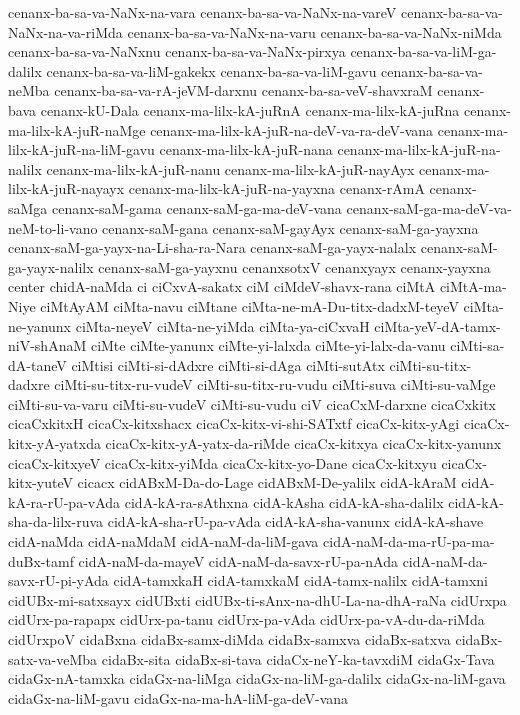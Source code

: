 {cenanx-ba-sa-va-NaNx-na-vara
cenanx-ba-sa-va-NaNx-na-vareV
cenanx-ba-sa-va-NaNx-na-va-riMda
cenanx-ba-sa-va-NaNx-na-varu
cenanx-ba-sa-va-NaNx-niMda
cenanx-ba-sa-va-NaNxnu
cenanx-ba-sa-va-NaNx-pirxya
cenanx-ba-sa-va-liM-ga-dalilx
cenanx-ba-sa-va-liM-gakekx
cenanx-ba-sa-va-liM-gavu
cenanx-ba-sa-va-neMba
cenanx-ba-sa-va-rA-jeVM-darxnu
cenanx-ba-sa-veV-shavxraM
cenanx-bava
cenanx-kU-Dala
cenanx-ma-lilx-kA-juRnA
cenanx-ma-lilx-kA-juRna
cenanx-ma-lilx-kA-juR-naMge
cenanx-ma-lilx-kA-juR-na-deV-va-ra-deV-vana
cenanx-ma-lilx-kA-juR-na-liM-gavu
cenanx-ma-lilx-kA-juR-nana
cenanx-ma-lilx-kA-juR-na-nalilx
cenanx-ma-lilx-kA-juR-nanu
cenanx-ma-lilx-kA-juR-nayAyx
cenanx-ma-lilx-kA-juR-nayayx
cenanx-ma-lilx-kA-juR-na-yayxna
cenanx-rAmA
cenanx-saMga
cenanx-saM-gama
cenanx-saM-ga-ma-deV-vana
cenanx-saM-ga-ma-deV-va-neM-to-li-vano
cenanx-saM-gana
cenanx-saM-gayAyx
cenanx-saM-ga-yayxna
cenanx-saM-ga-yayx-na-Li-sha-ra-Nara
cenanx-saM-ga-yayx-nalalx
cenanx-saM-ga-yayx-nalilx
cenanx-saM-ga-yayxnu
cenanxsotxV
cenanxyayx
cenanx-yayxna
center
chidA-naMda
ci
ciCxvA-sakatx
ciM
ciMdeV-shavx-rana
ciMtA
ciMtA-ma-Niye
ciMtAyAM
ciMta-navu
ciMtane
ciMta-ne-mA-Du-titx-dadxM-teyeV
ciMta-ne-yanunx
ciMta-neyeV
ciMta-ne-yiMda
ciMta-ya-ciCxvaH
ciMta-yeV-dA-tamx-niV-shAnaM
ciMte
ciMte-yanunx
ciMte-yi-lalxda
ciMte-yi-lalx-da-vanu
ciMti-sa-dA-taneV
ciMtisi
ciMti-si-dAdxre
ciMti-si-dAga
ciMti-sutAtx
ciMti-su-titx-dadxre
ciMti-su-titx-ru-vudeV
ciMti-su-titx-ru-vudu
ciMti-suva
ciMti-su-vaMge
ciMti-su-va-varu
ciMti-su-vudeV
ciMti-su-vudu
ciV
cicaCxM-darxne
cicaCxkitx
cicaCxkitxH
cicaCx-kitxshacx
cicaCx-kitx-vi-shi-SATxtf
cicaCx-kitx-yAgi
cicaCx-kitx-yA-yatxda
cicaCx-kitx-yA-yatx-da-riMde
cicaCx-kitxya
cicaCx-kitx-yanunx
cicaCx-kitxyeV
cicaCx-kitx-yiMda
cicaCx-kitx-yo-Dane
cicaCx-kitxyu
cicaCx-kitx-yuteV
cicacx
cidABxM-Da-do-Lage
cidABxM-De-yalilx
cidA-kAraM
cidA-kA-ra-rU-pa-vAda
cidA-kA-ra-sAthxna
cidA-kAsha
cidA-kA-sha-dalilx
cidA-kA-sha-da-lilx-ruva
cidA-kA-sha-rU-pa-vAda
cidA-kA-sha-vanunx
cidA-kA-shave
cidA-naMda
cidA-naMdaM
cidA-naM-da-liM-gava
cidA-naM-da-ma-rU-pa-ma-duBx-tamf
cidA-naM-da-mayeV
cidA-naM-da-savx-rU-pa-nAda
cidA-naM-da-savx-rU-pi-yAda
cidA-tamxkaH
cidA-tamxkaM
cidA-tamx-nalilx
cidA-tamxni
cidUBx-mi-satxsayx
cidUBxti
cidUBx-ti-sAnx-na-dhU-La-na-dhA-raNa
cidUrxpa
cidUrx-pa-rapapx
cidUrx-pa-tanu
cidUrx-pa-vAda
cidUrx-pa-vA-du-da-riMda
cidUrxpoV
cidaBxna
cidaBx-samx-diMda
cidaBx-samxva
cidaBx-satxva
cidaBx-satx-va-veMba
cidaBx-sita
cidaBx-si-tava
cidaCx-neY-ka-tavxdiM
cidaGx-Tava
cidaGx-nA-tamxka
cidaGx-na-liMga
cidaGx-na-liM-ga-dalilx
cidaGx-na-liM-gava
cidaGx-na-liM-gavu
cidaGx-na-ma-hA-liM-ga-deV-vana
}

